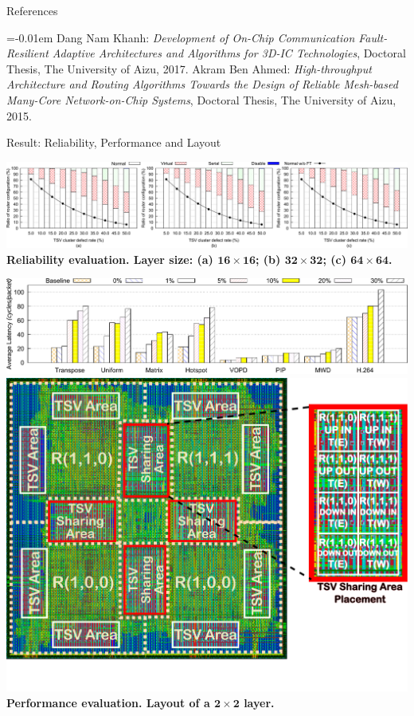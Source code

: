 \documentclass[a1paper,portrait]{baposter}
\let\oldtextbf\textbf
\renewcommand{\textbf}[1]{\textcolor{aaublue1}{\oldtextbf{#1}}}
\begin{document}
\begin{poster}
\begin{posterbox}[name=refs,column=1,span=1,below=tech]{References}

    
    \begin{thebibliography}{1}%
        \itemsep=-0.01em%
        \setlength{\baselineskip}{0.4em}%
         Dang Nam Khanh: \emph{\color{aaublue2}Development of On-Chip Communication Fault-Resilient Adaptive Architectures and Algorithms for 3D-IC Technologies}, Doctoral Thesis, The University of Aizu, 2017. 
         Akram Ben Ahmed: \emph{\color{aaublue2}High-throughput Architecture and Routing Algorithms Towards the Design of Reliable Mesh-based Many-Core Network-on-Chip Systems}, Doctoral Thesis, The University of Aizu, 2015. 
    \end{thebibliography}

\end{posterbox}

\begin{posterbox}[name=perf,column=0,above=bottom,span=2]{Result: Reliability, Performance and Layout }
\begin{center}
    \includegraphics[width=1\linewidth]{figs/reli.pdf} \\
    \textbf{\small Reliability evaluation. Layer size: (a) $\mathbf{16\times16}$; (b) $\mathbf{32\times32}$; (c) $\mathbf{64\times64}$. }
\end{center}
        \includegraphics[width=.75\linewidth]{figs/perf.pdf}\hspace*{0.5cm} \includegraphics[width=.22\linewidth]{figs/layout.pdf} \\
        \textbf{\small\hspace*{8cm}Performance evaluation. \hspace*{9cm} Layout of a $\mathbf{2\times2}$ layer.}
\end{posterbox}
\end{poster}
\end{document}
